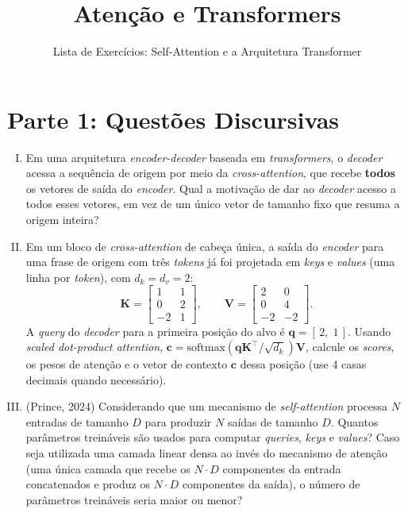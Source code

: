 \documentclass{dlproblemset}
\title{Atenção e Transformers}
\subtitle{Lista de Exercícios: Self-Attention e a Arquitetura Transformer}
\begin{document}
\section*{Parte 1: Questões Discursivas}

\begin{enumerate}[I)]

    \item Em uma arquitetura \textit{encoder-decoder} baseada em \textit{transformers}, o \textit{decoder} acessa a sequência de origem por meio da \textit{cross-attention}, que recebe \textbf{todos} os vetores de saída do \textit{encoder}. Qual a motivação de dar ao \textit{decoder} acesso a todos esses vetores, em vez de um único vetor de tamanho fixo que resuma a origem inteira?

    \item Em um bloco de \textit{cross-attention} de cabeça única, a saída do \textit{encoder} para uma frase de origem com três \textit{tokens} já foi projetada em \textit{keys} e \textit{values} (uma linha por \textit{token}), com $d_k = d_v = 2$:
    \[
        \mathbf{K} = \begin{bmatrix} 1 & 1 \\ 0 & 2 \\ -2 & 1 \end{bmatrix}, \qquad
        \mathbf{V} = \begin{bmatrix} 2 & 0 \\ 0 & 4 \\ -2 & -2 \end{bmatrix}.
    \]
    A \textit{query} do \textit{decoder} para a primeira posição do alvo é $\mathbf{q} = [\,2,\; 1\,]$. Usando \textit{scaled dot-product attention}, $\mathbf{c} = \mathrm{softmax}\!\left(\mathbf{q}\mathbf{K}^\top / \sqrt{d_k}\right)\mathbf{V}$, calcule os \textit{scores}, os pesos de atenção e o vetor de contexto $\mathbf{c}$ dessa posição (use 4 casas decimais quando necessário).

    \item (Prince, 2024) Considerando que um mecanismo de \textit{self-attention} processa $N$ entradas de tamanho $D$ para produzir $N$ saídas de tamanho $D$.
    Quantos parâmetros treináveis são usados para computar \textit{queries}, \textit{keys} e \textit{values}?
    Caso seja utilizada uma camada linear densa ao invés do mecanismo de atenção (uma única camada que recebe os $N \cdot D$ componentes da entrada concatenados e produz os $N \cdot D$ componentes da saída), o número de parâmetros treináveis seria maior ou menor?


\end{enumerate}
\end{document}
